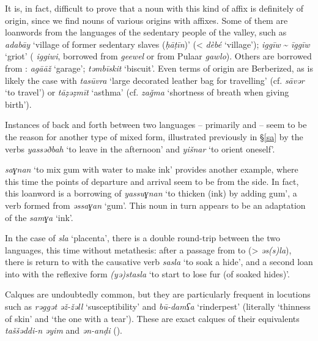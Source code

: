 \documentclass[output=paper]{langsci/langscibook}
\begin{document}
It is, in fact, difficult to prove that a noun with this kind of affix is definitely of  origin, since we find nouns of various origins with  affixes. Some of them are {loanwords} from the languages of the sedentary people of the valley, such as \textit{adabāy} ‘village of former sedentary slaves (\textit{ḥ{\R}āṭīn})’ (<  \textit{dèbé} ‘village’); \textit{iggīw} \~{} \textit{īggīw} ‘griot’ ( \textit{iggiwi}, borrowed from  \textit{geewel} or from Pulaar \textit{gawlo}). Others are borrowed from : \textit{agā{\R}āž} ‘garage’; \textit{təmbīskit} ‘biscuit’. Even terms of  origin are Berberized, as is likely the case with \textit{tasūvra} ‘large decorated leather bag for travelling’ (cf. \textit{sāvər} ‘to travel’) or \textit{tāẓəẓmīt} ‘asthma’ (cf.  \textit{zaǧma} ‘shortness of breath when giving birth’).


Instances of back and forth between two languages – primarily  and  – seem to be the reason for another type of mixed form, illustrated previously in §\ref{sa} by the  verbs \textit{yassəðbah} ‘to leave in the afternoon’ and \textit{yišnar} ‘to orient oneself’.

 \textit{saɣnan} ‘to mix gum with water to make ink’ provides another example, where this time the points of departure and arrival seem to be from the  side. In fact, this {loanword} is a borrowing of  \textit{yassuɣnan} ‘to thicken (ink) by adding gum’, a verb formed from \textit{əssaɣan} ‘gum’. This noun in turn appears to be an adaptation of the  \textit{samɣa} ‘ink’. 

In the case of \textit{sla} ‘placenta’, there is a double round-trip between the two languages, this time without metathesis: after a passage from  to  (> \textit{əs(s)la}), there is return to  with the {causative} verb \textit{sasla} ‘to soak a hide’, and a second loan into  with the reflexive form \textit{(yə)stasla} ‘to start to lose fur (of soaked hides)’.


Calques are undoubtedly common, but they are particularly frequent in locutions such as \textit{rəggət} \textit{əž-žəll} ‘susceptibility’ and \textit{bū-damʕa} ‘rinderpest’ (literally ‘thinness of skin’ and ‘the one with a tear’). These are exact calques of their  equivalents \textit{taššəddi-n} \textit{əyim} and \textit{ən-anḍi} (\citealt{Taine-Cheikh2008chapter}).
\end{document}

